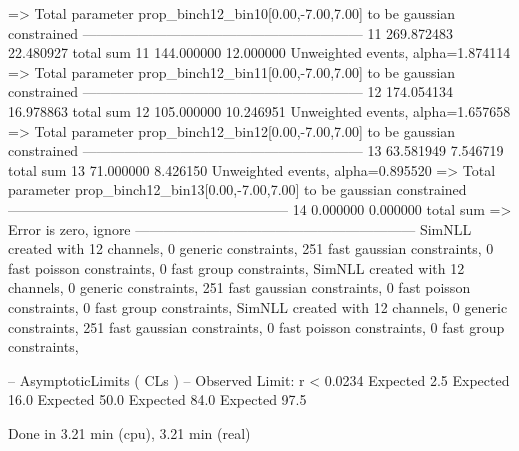   => Total parameter prop_binch12_bin10[0.00,-7.00,7.00] to be gaussian constrained
------------------------------------------------------------
11         269.872483      22.480927       total sum                     
11         144.000000      12.000000       Unweighted events, alpha=1.874114
  => Total parameter prop_binch12_bin11[0.00,-7.00,7.00] to be gaussian constrained
------------------------------------------------------------
12         174.054134      16.978863       total sum                     
12         105.000000      10.246951       Unweighted events, alpha=1.657658
  => Total parameter prop_binch12_bin12[0.00,-7.00,7.00] to be gaussian constrained
------------------------------------------------------------
13         63.581949       7.546719        total sum                     
13         71.000000       8.426150        Unweighted events, alpha=0.895520
  => Total parameter prop_binch12_bin13[0.00,-7.00,7.00] to be gaussian constrained
------------------------------------------------------------
14         0.000000        0.000000        total sum                     
  => Error is zero, ignore      
------------------------------------------------------------
SimNLL created with 12 channels, 0 generic constraints, 251 fast gaussian constraints, 0 fast poisson constraints, 0 fast group constraints, 
SimNLL created with 12 channels, 0 generic constraints, 251 fast gaussian constraints, 0 fast poisson constraints, 0 fast group constraints, 
SimNLL created with 12 channels, 0 generic constraints, 251 fast gaussian constraints, 0 fast poisson constraints, 0 fast group constraints, 

 -- AsymptoticLimits ( CLs ) --
Observed Limit: r < 0.0234
Expected  2.5%
Expected 16.0%
Expected 50.0%
Expected 84.0%
Expected 97.5%

Done in 3.21 min (cpu), 3.21 min (real)
